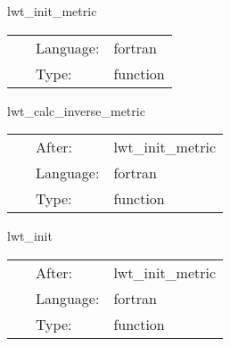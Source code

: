 \vspace{5mm}


\hspace{5mm} lwt\_init\_metric 

\hspace{5mm}{\it initialise the metric } 


\hspace{5mm}

 \begin{tabular*}{160mm}{cll} 
~ & Language:  & fortran \\ 
~ & Type:  & function \\ 
\end{tabular*} 


\vspace{5mm}


\hspace{5mm} lwt\_calc\_inverse\_metric 

\hspace{5mm}{\it transform the metric } 


\hspace{5mm}

 \begin{tabular*}{160mm}{cll} 
~ & After:  & lwt\_init\_metric \\ 
~ & Language:  & fortran \\ 
~ & Type:  & function \\ 
\end{tabular*} 


\vspace{5mm}


\hspace{5mm} lwt\_init 

\hspace{5mm}{\it initialise the system } 


\hspace{5mm}

 \begin{tabular*}{160mm}{cll} 
~ & After:  & lwt\_init\_metric \\ 
~ & Language:  & fortran \\ 
~ & Type:  & function \\ 
\end{tabular*} 


\vspace{5mm}

